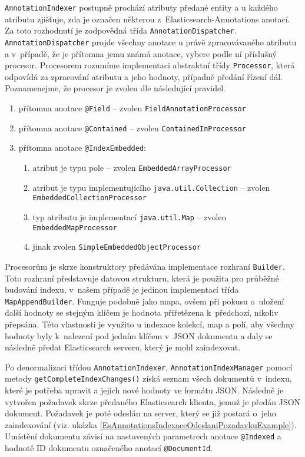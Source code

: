 \documentclass[11pt,oneside]{fithesis2}
\begin{document}
\texttt{AnnotationIndexer} postupně prochází atributy předané entity a u každého atributu zjišťuje, zda je označen některou z~Elasticsearch-Annotations anotací. Za toto rozhodnutí je zodpovědná třída \texttt{AnnotationDispatcher}. \texttt{AnnotationDispatcher} projde všechny anotace u právě zpracovávaného atributu a v~případě, že je přítomna jemu známá anotace, vybere podle ní příslušný procesor. Procesorem rozumíme implementaci abstraktní třídy \texttt{Processor}, která odpovídá za  zpracování atributu a jeho hodnoty, případně předání řízení dál. Poznamenejme, že procesor je zvolen dle následující pravidel.

\begin{enumerate}
	\item přítomna anotace \texttt{@Field} -- zvolen \texttt{FieldAnnotationProcessor}
	\item přítomna anotace \texttt{@Contained} -- zvolen \texttt{ContainedInProcessor}
	\item přítomna anotace \texttt{@IndexEmbedded}:
	\begin{enumerate}
		\item atribut je typu pole -- zvolen \texttt{EmbeddedArrayProcessor}  
		\item atribut je typu implementujícího \texttt{java.util.Collection} -- zvolen \texttt{EmbeddedCollectionProcessor}  
		\item typ atributu je implementací \texttt{java.util.Map} -- zvolen \\ \texttt{EmbeddedMapProcessor} 
		\item jinak zvolen \texttt{SimpleEmbeddedObjectProcessor} 
	\end{enumerate}
\end{enumerate}

Procesorům je skrze konstruktory předávána implementace rozhraní \texttt{Builder}. Toto rozhraní představuje datovou strukturu, která je použita pro průběžné budování indexu, v~našem případě je jedinou implementací třída \texttt{MapAppendBuilder}. Funguje podobně jako mapa, ovšem při pokusu o~uložení další hodnoty se stejným klíčem je hodnota přiřetězena k~předchozí, nikoliv přepsána. Této vlastnosti je využito u indexace kolekcí, map a polí, aby všechny hodnoty byly k~nalezení pod jedním klíčem v~JSON dokumentu a daly se následně předat Elasticsearch serveru, který je mohl zaindexovat. 

Po denormalizaci třídou \texttt{AnnotationIndexer}, \texttt{AnnotationIndexManager} pomocí metody \texttt{getCompleteIndexChanges()} získá seznam všech dokumentů v~indexu, které je potřeba upravit a jejich nové hodnoty ve formátu JSON. Následně je vytvořen požadavek skrze předaného Elasticsearch klienta, jemuž je předán JSON dokument. Požadavek je poté odeslán na server, který se již postará o~jeho zaindexování (viz. ukázka \ref{EsAnnotationsIndexaceOdeslaniPozadavkuExample}). Umístění dokumentu závisí na nastavených parametrech anotace \texttt{@Indexed} a hodnotě ID dokumentu označeného anotací \texttt{@DocumentId}.
\end{document}
